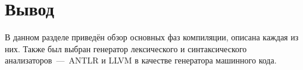 \section{Вывод}

В данном разделе приведён обзор основных фаз компиляции, описана каждая из них. 
Также был выбран генератор лексического и синтаксического анализаторов~---~ANTLR и LLVM в качестве генератора машинного кода.


















 
